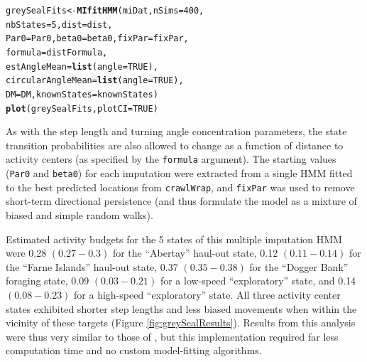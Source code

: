 \documentclass[12pt]{article}\usepackage[]{graphicx}\usepackage[]{color}
\makeatletter
\newcommand{\hlnum}[1]{\textcolor[rgb]{0.686,0.059,0.569}{#1}}%
\newcommand{\hlstd}[1]{\textcolor[rgb]{0.345,0.345,0.345}{#1}}%
\newcommand{\hlkwb}[1]{\textcolor[rgb]{0.69,0.353,0.396}{#1}}%
\newcommand{\hlkwc}[1]{\textcolor[rgb]{0.333,0.667,0.333}{#1}}%
\newcommand{\hlkwd}[1]{\textcolor[rgb]{0.737,0.353,0.396}{\textbf{#1}}}%
\newenvironment{kframe}{%
 \def\at@end@of@kframe{}%
 \ifinner\ifhmode%
  \def\at@end@of@kframe{\end{minipage}}%
  \begin{minipage}{\columnwidth}%
 \fi\fi%
 \def\FrameCommand##1{\hskip\@totalleftmargin \hskip-\fboxsep
 \colorbox{shadecolor}{##1}\hskip-\fboxsep
     \hskip-\linewidth \hskip-\@totalleftmargin \hskip\columnwidth}%
 \MakeFramed {\advance\hsize-\width
   \@totalleftmargin\z@ \linewidth\hsize
   \@setminipage}}%
 {\par\unskip\endMakeFramed%
 \at@end@of@kframe}
\newenvironment{knitrout}{}{} %
\makeatother
\begin{document}
\begin{knitrout}
\color{fgcolor}\begin{kframe}
\begin{alltt}
\hlstd{greySealFits} \hlkwb{<-} \hlkwd{MIfitHMM}\hlstd{(miDat,} \hlkwc{nSims} \hlstd{=} \hlnum{400}\hlstd{,}
                         \hlkwc{nbStates} \hlstd{=} \hlnum{5}\hlstd{,} \hlkwc{dist} \hlstd{= dist,}
                         \hlkwc{Par0} \hlstd{= Par0,} \hlkwc{beta0} \hlstd{= beta0,} \hlkwc{fixPar} \hlstd{= fixPar,}
                         \hlkwc{formula} \hlstd{= distFormula,}
                         \hlkwc{estAngleMean} \hlstd{=} \hlkwd{list}\hlstd{(}\hlkwc{angle}\hlstd{=}\hlnum{TRUE}\hlstd{),}
                         \hlkwc{circularAngleMean} \hlstd{=} \hlkwd{list}\hlstd{(}\hlkwc{angle}\hlstd{=}\hlnum{TRUE}\hlstd{),}
                         \hlkwc{DM} \hlstd{= DM,} \hlkwc{knownStates} \hlstd{= knownStates)}
\hlkwd{plot}\hlstd{(greySealFits,} \hlkwc{plotCI} \hlstd{=} \hlnum{TRUE}\hlstd{)}
\end{alltt}
\end{kframe}
\end{knitrout}
As with the step length and turning angle concentration parameters, the state transition probabilities are also allowed to change as a function of distance to activity centers (as specified by the \verb|formula| argument). The starting values (\verb|Par0| and \verb|beta0|) for each imputation were extracted from a single HMM fitted to the best predicted locations from \verb|crawlWrap|, and \verb|fixPar| was used to remove short-term directional persistence (and thus formulate the model as a mixture of biased and simple random walks). 

Estimated activity budgets for the 5 states of this multiple imputation HMM were 0.28 $(0.27-0.3)$ for the ``Abertay'' haul-out state, 0.12 $(0.11-0.14)$ for the ``Farne Islands'' haul-out state, 0.37 $(0.35-0.38)$ for the ``Dogger Bank'' foraging state, 0.09 $(0.03-0.21)$ for a low-speed ``exploratory'' state, and 0.14 $(0.08-0.23)$ for a high-speed ``exploratory'' state. All three activity center states exhibited shorter step lengths and less biased movements when within the vicinity of these targets (Figure \ref{fig:greySealResults}). Results from this analysis were thus very similar to those of \cite{McClintockEtAl2012}, but this implementation required far less computation time and no custom model-fitting algorithms. 
\end{document}
